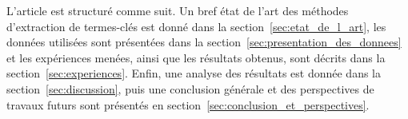   L'article est structuré comme suit. Un bref état de l'art des méthodes
  d'extraction de termes-clés est donné dans la
  section~\ref{sec:etat_de_l_art}, les données utilisées sont présentées dans la
  section~\ref{sec:presentation_des_donnees} et les expériences menées, ainsi
  que les résultats obtenus, sont décrits dans la section~\ref{sec:experiences}.
  Enfin, une analyse des résultats est donnée dans la
  section~\ref{sec:discussion}, puis une conclusion générale et des perspectives
  de travaux futurs sont présentés en
  section~\ref{sec:conclusion_et_perspectives}.

